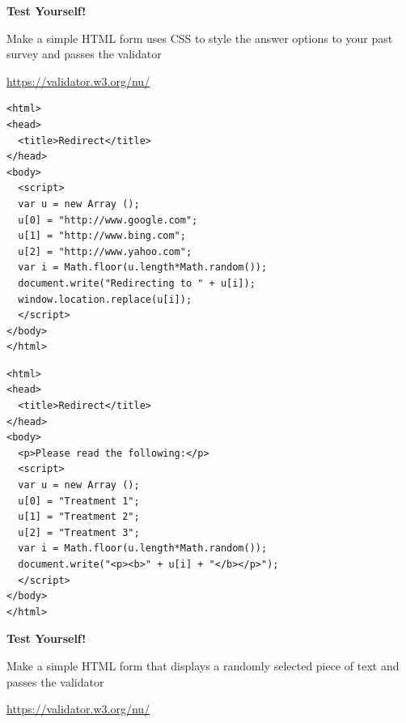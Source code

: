 \bgroup
{}
\begin{frame}[plain]{}
\begin{center}
\textbf{{\Large Test Yourself!}}

\vspace{2em}

Make a simple HTML form uses CSS to style the answer options to your past survey and passes the validator

\vspace{2em}

\url{https://validator.w3.org/nu/}
\end{center}
\end{frame}
\egroup



\begin{frame}[fragile]
\small
\begin{verbatim}
<html>
<head>
  <title>Redirect</title>
</head>
<body>
  <script>
  var u = new Array ();
  u[0] = "http://www.google.com";
  u[1] = "http://www.bing.com";
  u[2] = "http://www.yahoo.com";
  var i = Math.floor(u.length*Math.random());
  document.write("Redirecting to " + u[i]);
  window.location.replace(u[i]);
  </script>
</body>
</html>
\end{verbatim}
\end{frame}



\begin{frame}[fragile]
\small
\begin{verbatim}
<html>
<head>
  <title>Redirect</title>
</head>
<body>
  <p>Please read the following:</p>
  <script>
  var u = new Array ();
  u[0] = "Treatment 1";
  u[1] = "Treatment 2";
  u[2] = "Treatment 3";
  var i = Math.floor(u.length*Math.random());
  document.write("<p><b>" + u[i] + "</b></p>");
  </script>
</body>
</html>
\end{verbatim}
\end{frame}



\bgroup
{}
\begin{frame}[plain]{}
\begin{center}
\textbf{{\Large Test Yourself!}}

\vspace{2em}

Make a simple HTML form that displays a randomly selected piece of text and passes the validator

\vspace{2em}

\url{https://validator.w3.org/nu/}
\end{center}
\end{frame}
\egroup



